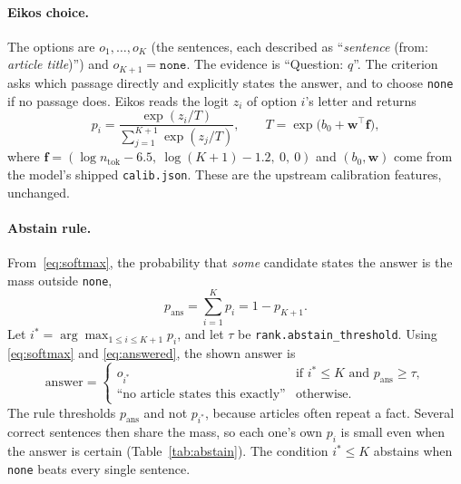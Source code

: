 \documentclass[11pt,a4paper]{article}
\newcommand{\code}[1]{\texttt{#1}}
\begin{document}
\paragraph{Eikos choice.} The options are $o_1,\dots,o_K$ (the sentences, each described as ``\textit{sentence}
(from: \textit{article title})'') and $o_{K+1}=\code{none}$. The evidence is ``Question: $q$''. The criterion asks
which passage directly and explicitly states the answer, and to choose \code{none} if no passage does. Eikos reads
the logit $z_i$ of option $i$'s letter and returns
\begin{equation}
  p_i=\frac{\exp(z_i/T)}{\sum_{j=1}^{K+1}\exp(z_j/T)},\qquad
  T=\exp\!\bigl(b_0+\mathbf w^{\top}\mathbf f\bigr),
  \label{eq:softmax}
\end{equation}
where $\mathbf f=(\log n_{\text{tok}}-6.5,\ \log(K{+}1)-1.2,\ 0,\ 0)$ and $(b_0,\mathbf w)$ come from the model's
shipped \code{calib.json}. These are the upstream calibration features, unchanged.

\paragraph{Abstain rule.} From~\eqref{eq:softmax}, the probability that \emph{some} candidate states the answer
is the mass outside \code{none},
\begin{equation}
  p_{\text{ans}}=\sum_{i=1}^{K}p_i=1-p_{K+1}.
  \label{eq:answered}
\end{equation}
Let $i^\ast=\arg\max_{1\le i\le K+1}p_i$, and let $\tau$ be \code{rank.abstain\_threshold}. Using \eqref{eq:softmax}
and \eqref{eq:answered}, the shown answer is
\begin{equation}
  \text{answer}=
  \begin{cases}
    o_{i^\ast} & \text{if } i^\ast\le K \text{ and } p_{\text{ans}}\ge\tau,\\
    \text{``no article states this exactly''} & \text{otherwise.}
  \end{cases}
  \label{eq:abstain}
\end{equation}
The rule thresholds $p_{\text{ans}}$ and not $p_{i^\ast}$, because articles often repeat a fact. Several correct
sentences then share the mass, so each one's own $p_i$ is small even when the answer is certain
(Table~\ref{tab:abstain}). The condition $i^\ast\le K$ abstains when \code{none} beats every single sentence.
\end{document}
